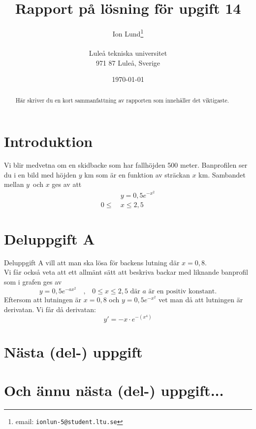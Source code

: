 \documentclass[a4paper,12pt]{article}
\title{Rapport på lösning för upgift 14}
\author{Ion Lund\thanks{email:
        \texttt{ionlun-5@student.ltu.se}}\\  
        ~ \\
        Luleå tekniska universitet \\ 
        971 87 Luleå, Sverige}
\date{\today}
\begin{document}
\linenumbers %

\maketitle

\begin{abstract}
  Här skriver du en kort sammanfattning av rapporten som innehåller
  det viktigaste. 
\end{abstract}

\section{Introduktion}
  \label{sec:introduktion}
  Vi blir medvetna om en skidbacke som har fallhöjden 500 meter. Banprofilen ser 
  du i en bild 
  med höjden $y$ km som är en funktion av sträckan $x$ km.
  Sambandet mellan $y$ och $x$ ges av att
  \begin{align}
    \label{eq:1}
    &y = 0,5e^{-x^2} \\
    0 \le~&x \le 2,5
  \end{align}
\section{Deluppgift A}
  \label{sec:uppg1}
  Deluppgift A vill att man ska lösa för backens lutning där $x = 0,8$.\\
  Vi får också veta att ett allmänt sätt att beskriva backar med liknande
  banprofil som i grafen ges av
  \begin{displaymath}
    y = 0,5e^{-ax^2}
    \quad \text{,} \quad 
    0 \le x \le 2,5
    \text{ där $a$ är en positiv konstant.}
  \end{displaymath}
  \newpage
  Eftersom att lutningen är  
  $x = 0,8$ 
  och $y=0,5e^{-x^2}$ 
  vet man då att lutningen är derivatan. Vi får då derivatan:
  \begin{equation}
    y\prime = -x \cdot e^{-(x^4)}
  \end{equation}

\section{Nästa (del-) uppgift}
\label{sec:uppg2}

\section{Och ännu nästa (del-) uppgift...}
\label{sec:uppgN}
\end{document}
